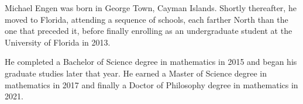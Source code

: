 Michael Engen was born in George Town, Cayman Islands. Shortly thereafter, he moved to Florida, attending a sequence of schools, each farther North than the one that preceded it, before finally enrolling as an undergraduate student at the University of Florida in 2013.

He completed a Bachelor of Science degree in mathematics in 2015 and began his graduate studies later that year. He earned a Master of Science degree in mathematics in 2017 and finally a Doctor of Philosophy degree in mathematics in 2021.